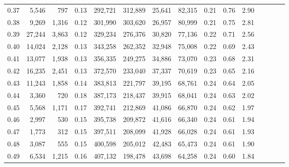 \begin{tabular}{rrrcrrrrrrrrrrr}
0.37 &   5,546 &     797 &                                       0.13 &  292,721 &  312,889 &   25,641 &   82,315 &  0.21 &  0.76 &                         2.90 \\
0.38 &   9,269 &   1,316 &                                       0.12 &  301,990 &  303,620 &   26,957 &   80,999 &  0.21 &  0.75 &                         2.81 \\
0.39 &  27,244 &   3,863 &                                       0.12 &  329,234 &  276,376 &   30,820 &   77,136 &  0.22 &  0.71 &                         2.56 \\
0.40 &  14,024 &   2,128 &                                       0.13 &  343,258 &  262,352 &   32,948 &   75,008 &  0.22 &  0.69 &                         2.43 \\
0.41 &  13,077 &   1,938 &                                       0.13 &  356,335 &  249,275 &   34,886 &   73,070 &  0.23 &  0.68 &                         2.31 \\
0.42 &  16,235 &   2,451 &                                       0.13 &  372,570 &  233,040 &   37,337 &   70,619 &  0.23 &  0.65 &                         2.16 \\
0.43 &  11,243 &   1,858 &                                       0.14 &  383,813 &  221,797 &   39,195 &   68,761 &  0.24 &  0.64 &                         2.05 \\
0.44 &   3,360 &     720 &                                       0.18 &  387,173 &  218,437 &   39,915 &   68,041 &  0.24 &  0.63 &                         2.02 \\
0.45 &   5,568 &   1,171 &                                       0.17 &  392,741 &  212,869 &   41,086 &   66,870 &  0.24 &  0.62 &                         1.97 \\
0.46 &   2,997 &     530 &                                       0.15 &  395,738 &  209,872 &   41,616 &   66,340 &  0.24 &  0.61 &                         1.94 \\
0.47 &   1,773 &     312 &                                       0.15 &  397,511 &  208,099 &   41,928 &   66,028 &  0.24 &  0.61 &                         1.93 \\
0.48 &   3,087 &     555 &                                       0.15 &  400,598 &  205,012 &   42,483 &   65,473 &  0.24 &  0.61 &                         1.90 \\
0.49 &   6,534 &   1,215 &                                       0.16 &  407,132 &  198,478 &   43,698 &   64,258 &  0.24 &  0.60 &                         1.84 \\

\end{tabular}
